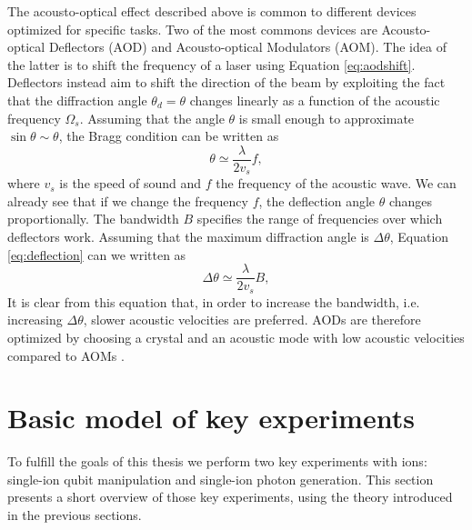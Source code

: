 The acousto-optical effect described above is common to different devices optimized for specific tasks. Two of the most commons devices are Acousto-optical Deflectors (AOD) and Acousto-optical Modulators (AOM). The idea of the latter is to shift the frequency of a laser using Equation \eqref{eq:aodshift}. Deflectors instead aim to shift the direction of the beam by exploiting the fact that the diffraction angle $\theta_d = \theta$ changes linearly as a function of the acoustic frequency $\Omega_s$. Assuming that the angle $\theta$ is small enough to approximate $\sin\theta \sim \theta$, the Bragg condition can be written as
\begin{equation}
\label{eq:deflection}
\theta \simeq \frac{\lambda}{2 v_s}f,
\end{equation}
where $v_s$ is the speed of sound and $f$ the frequency of the acoustic wave. We can already see that if we change the frequency $f$, the deflection angle $\theta$ changes proportionally. The bandwidth $B$ specifies the range of frequencies over which deflectors work. Assuming that the maximum diffraction angle is $\Delta\theta$, Equation \eqref{eq:deflection} can we written as \cite{Rmer2014}
\begin{equation}
\label{eq:deflection}
\Delta\theta \simeq \frac{\lambda}{2 v_s}B,
\end{equation}
It is clear from this equation that, in order to increase the bandwidth, i.e. increasing $\Delta \theta$, slower acoustic velocities are preferred. AODs are therefore optimized by choosing a crystal and an acoustic mode with low acoustic velocities compared to AOMs \cite{handbookoptics}.%

\section{Basic model of key experiments}
To fulfill the goals of this thesis we perform two key experiments with ions: single-ion qubit manipulation and single-ion photon generation. This section presents a short overview of those key experiments, using the theory introduced in the previous sections.

